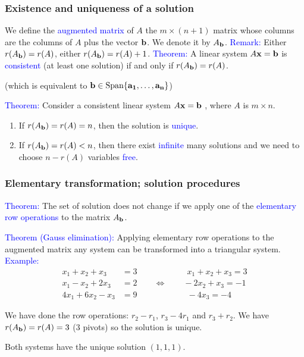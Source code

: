 \documentclass[11pt,aspectratio=169]{beamer}
\begin{document}
\begin{frame}
\frametitle{Existence and uniqueness of a solution}
\begin{small}
 We define the \textcolor{blue}{augmented matrix} of $A$ the $m \times (n+1)$ matrix whose columns are the columns of $A$ plus the vector ${\bf b}$. We denote it by $A_{{\bf b}}$.
\vskip 10pt
\textcolor{blue}{Remark:} Either $r(A_{{\bf b}})=r(A)$, either $r(A_{{\bf b}})=r(A)+1$.
\vskip 10pt
 \textcolor{blue}{Theorem:} A linear system $A {\bf x}={\bf b}$ is \textcolor{blue}{consistent} (at least one solution) if and only if $r(A_{{\bf b}})=r(A)$. \begin{tiny} (which is equivalent to ${\bf b}\in \text{Span}\{ {\bf a_1},\ldots,{\bf a_n}\}$)\end{tiny}
\vskip 12pt
 \textcolor{blue}{Theorem:} Consider a consistent linear system $A {\bf x}={\bf b}$ , where $A$ is $m \times n$.
\begin{enumerate}
\item If $r(A_{{\bf b}})=r(A)=n$, then the solution is \textcolor{blue}{unique}.
\vskip 12pt
\item If $r(A_{{\bf b}})=r(A)<n$, then there exist \textcolor{blue}{infinite} many solutions and we need to choose $n-r(A)$ variables \textcolor{blue}{free}.
\end{enumerate}



\end{small}
\end{frame}\begin{frame}
\frametitle{Elementary transformation; solution procedures}
\begin{small}
\textcolor{blue}{Theorem:} The set of solution does not change if we apply one of the \textcolor{blue}{elementary row operations} to the matrix $A_{{\bf b}}$.

\vskip 12pt

\textcolor{blue}{Theorem (Gauss elimination):} Applying elementary row operations  
to the augmented matrix any system can be transformed into a triangular system.
\vskip 12pt
\textcolor{blue}{Example:}
\begin{equation*}
\begin{split}
x_1+x_2+x_3&=3 \qquad \qquad \qquad x_1+x_2+x_3=3 \\
x_1-x_2+2x_3&=2 \qquad \Longleftrightarrow\qquad -2x_2+x_3=-1\\
4x_1+6x_2-x_3&=9 \qquad \qquad \qquad -4x_3=-4
\end{split}
\end{equation*}
\begin{tiny}
We have done the row operations: $r_2-r_1$, $r_3-4r_1$ and $r_3+r_2$. 
\vskip 10pt
We have $r(A_{{\bf b}})=r(A)=3$ (3 pivots) so the solution is unique.

Both systems have  the unique solution $(1,1,1)$. \end{tiny}


\end{small}
\end{frame}
\end{document}
